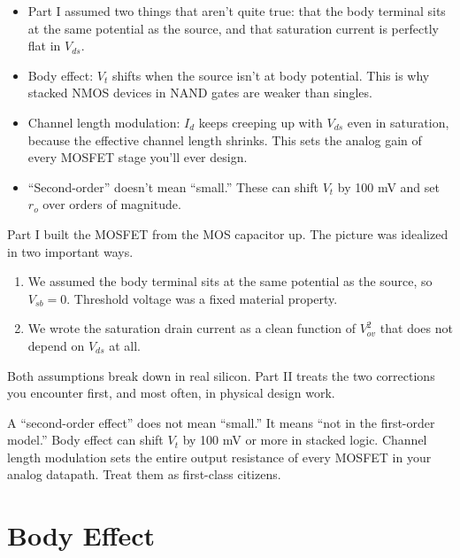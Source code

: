 \documentclass[11pt]{article}
\begin{document}
\begin{tldr}
\begin{itemize}[leftmargin=*]
\item Part I assumed two things that aren't quite true: that the body terminal sits at the same potential as the source, and that saturation current is perfectly flat in $V_{ds}$.
\item Body effect: $V_t$ shifts when the source isn't at body potential. This is why stacked NMOS devices in NAND gates are weaker than singles.
\item Channel length modulation: $I_d$ keeps creeping up with $V_{ds}$ even in saturation, because the effective channel length shrinks. This sets the analog gain of every MOSFET stage you'll ever design.
\item ``Second-order'' doesn't mean ``small.'' These can shift $V_t$ by 100 mV and set $r_o$ over orders of magnitude.
\end{itemize}
\end{tldr}

Part I built the MOSFET from the MOS capacitor up. The picture was idealized in two important ways.

\begin{enumerate}
\item We assumed the body terminal sits at the same potential as the source, so $V_{sb} = 0$. Threshold voltage was a fixed material property.
\item We wrote the saturation drain current as a clean function of $V_{ov}^2$ that does not depend on $V_{ds}$ at all.
\end{enumerate}

Both assumptions break down in real silicon. Part II treats the two corrections you encounter first, and most often, in physical design work.

\begin{keyidea}
A ``second-order effect'' does not mean ``small.'' It means ``not in the first-order model.'' Body effect can shift $V_t$ by 100 mV or more in stacked logic. Channel length modulation sets the entire output resistance of every MOSFET in your analog datapath. Treat them as first-class citizens.
\end{keyidea}

\section{Body Effect}
\end{document}
